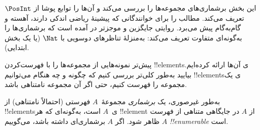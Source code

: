 \documentclass[../../../include/open-logic-section]{subfiles}
\begin{document}


\begin{editorial}
  این بخش برشماری‌های مجموعه‌ها را بررسی می‌کند و آن‌ها را توابع
  پوشا از $\PosInt$ تعریف می‌کند. مطالب را برای خوانندگانی که پیشینهٔ
  ریاضی اندکی دارند، آهسته و گام‌به‌گام پیش می‌برد. روایتی جایگزین و
  موجزتر در  آمده است که برشماری‌ها را به‌گونه‌ای
  متفاوت تعریف می‌کند: به‌منزلهٔ تناظرهای دوسویی با $\Nat$ (یا یک بخش ابتدایی).
\end{editorial}

\begin{explain}
پیش‌تر نمونه‌هایی از مجموعه‌ها را با فهرست‌کردن !!{element}sی آن‌ها
ارائه کرده‌ایم. بیایید به‌طور کلی‌تر بررسی کنیم که چگونه و چه هنگام
می‌توانیم !!{element}sی یک مجموعه را فهرست کنیم، حتی اگر آن مجموعه
نامتناهی باشد.
\end{explain}

\begin{defn}
به‌طور غیرصوری، یک \emph{برشماری} مجموعهٔ~$A$ فهرستی (احتمالاً
نامتناهی) از !!{element}sی~$A$ است، به‌گونه‌ای که هر !!{element}
از $A$ در جایگاهی متناهی از فهرست ظاهر شود. اگر $A$ برشماری‌ای داشته
باشد، می‌گوییم $A$ \emph{!!{enumerable}} است.
\end{defn}
\end{document}
